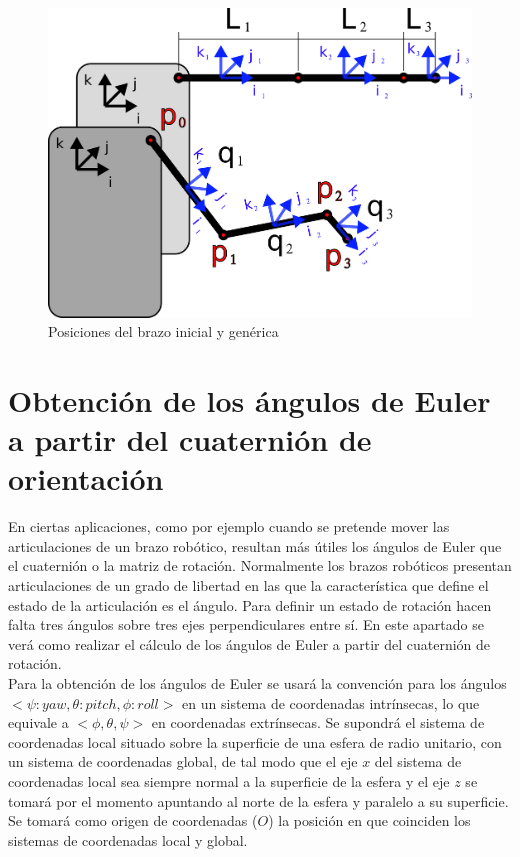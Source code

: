 \documentclass[10pt, a4paper]{report}
\begin{document}
\begin{figure}[h] 
	\centering
		\includegraphics[scale=0.8]{../img/arm_position.png} 
	\caption{Posiciones del brazo inicial y genérica}
	\label{fig: posiciones_brazo}
\end{figure}

\section{Obtención de los ángulos de Euler a partir del cuaternión de orientación}

En ciertas aplicaciones, como por ejemplo cuando se pretende mover las articulaciones de un brazo robótico, resultan más útiles los ángulos de Euler que el cuaternión o la matriz de rotación. Normalmente los brazos robóticos presentan articulaciones de un grado de libertad en las que la característica que define el estado de la articulación es el ángulo. Para definir un estado de rotación hacen falta tres ángulos sobre tres ejes perpendiculares entre sí. En este apartado se verá como realizar el cálculo de los ángulos de Euler a partir del cuaternión de rotación. \\

Para la obtención de los ángulos de Euler se usará la convención para los ángulos $<\psi: yaw, \theta: pitch, \phi: roll>$ en un sistema de coordenadas intrínsecas, lo que equivale a $<\phi, \theta, \psi>$ en coordenadas extrínsecas. Se supondrá el sistema de coordenadas local situado sobre la superficie de una esfera de radio unitario, con un sistema de coordenadas global, de tal modo que el eje $x$ del sistema de coordenadas local sea siempre normal a la superficie de la esfera y el eje $z$ se tomará por el momento apuntando al norte de la esfera y paralelo a su superficie. Se tomará como origen de coordenadas ($O$) la posición en que coinciden los sistemas de coordenadas local y global.
\end{document}
